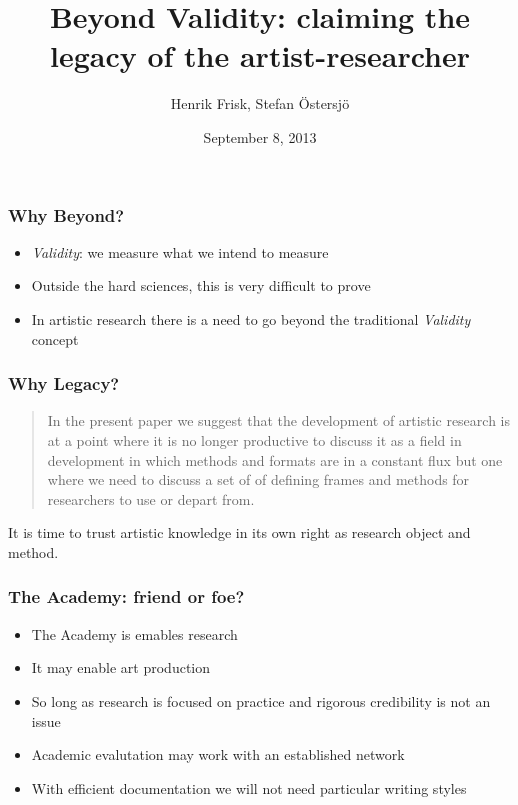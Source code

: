 \documentclass[ignorenonframetext]{beamer}
\title{Beyond Validity: claiming the legacy of the artist-researcher}
\author{Henrik Frisk, Stefan Östersjö}
\date{September  8, 2013}
\begin{document}
\frame{\titlepage}



\begin{frame}[fragile]
\frametitle{Why Beyond?}


\begin{itemize}
\item<1-> \emph{Validity}: we measure what we intend to measure
\item<1-> Outside the hard sciences, this is very difficult to prove
\item<2-> In artistic research there is a need to go \alert{beyond} the traditional \emph{Validity} concept
\end{itemize}

\end{frame}

\begin{frame}
  \frametitle{Why Legacy?}
  
  \begin{quotation}
  \noindent
    In the present paper we suggest that the development of artistic research
    is at a point where it is no longer productive to discuss it as a field in
    development in which methods and formats are in a constant flux but one
    where we need to discuss a set of of defining frames and methods for
    researchers to use or depart from.
  \end{quotation}

  \pause

  \begin{center}
    \alert{It is time to trust artistic knowledge in its own right as research object and method.}
  \end{center}

\end{frame}

\begin{frame}
  \frametitle{The Academy: friend or foe?}
  
  \begin{itemize}
  \item<1-> The Academy is emables research
  \item<2-> It may enable art production
  \item<3-> So long as research is focused on practice and rigorous credibility is not an issue
  \item<4-> Academic evalutation may work with an established network
  \item<5-> With efficient documentation we will not need particular writing styles
  \end{itemize}
\end{frame}
\end{document}
